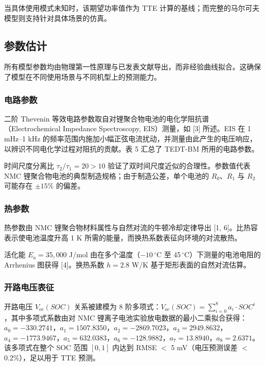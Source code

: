 \documentclass[11pt,a4paper]{ctexart}
\begin{document}
当具体使用模式未知时，该期望功率值作为 TTE 计算的基线；而完整的马尔可夫模型则支持针对具体场景的仿真。

\subsection{参数估计}

所有模型参数均由物理第一性原理与已发表文献导出，而非经验曲线拟合。这确保了模型在不同使用场景与不同机型上的预测能力。

\subsubsection{电路参数}

二阶 Thevenin 等效电路参数取自对锂聚合物电池的电化学阻抗谱（Electrochemical Impedance Spectroscopy, EIS）测量，如 [3] 所述。EIS 在 1 mHz--1 kHz 的频率范围内施加小幅正弦电流扰动，并测量由此产生的电压响应，以辨识不同电化学过程对阻抗的贡献。表 5 汇总了 TEDT-BM 所用的电路参数。

时间尺度分离比 $\tau_2/\tau_1 = 20 > 10$ 验证了双时间尺度近似的合理性。参数值代表 NMC 锂聚合物电池的典型制造规格；由于制造公差，单个电池的 $R_0$、$R_1$ 与 $R_2$ 可能存在 $\pm 15\%$ 的偏差。

\subsubsection{热参数}

热参数由 NMC 锂聚合物材料属性与自然对流的牛顿冷却定律导出 [1, 6]。比热容表示使电池温度升高 1 K 所需的能量，而换热系数表征向环境的对流散热。

活化能 $E_a = 35{,}000$ J/mol 由在多个温度（$-10\,^{\circ}$C 至 45\,$^{\circ}$C）下测量的电池电阻的 Arrhenius 图获得 [4]。换热系数 $h = 2.8$ W/K 基于矩形表面的自然对流估算。

\subsubsection{开路电压表征}

开路电压 $V_{oc}(SOC)$ 关系被建模为 8 阶多项式：$V_{oc}(SOC) = \sum_{i=0}^{8}a_i\cdot SOC^{i}$，其中多项式系数由对 NMC 锂离子电池实验放电数据的最小二乘拟合获得：$a_0 = -330.2741$，$a_1 = 1507.8350$，$a_2 = -2869.7023$，$a_3 = 2949.8632$，$a_4 = -1773.9467$，$a_5 = 632.0383$，$a_6 = -128.9882$，$a_7 = 13.8940$，$a_8 = 2.6371$。该多项式在整个 SOC 范围 $[0,1]$ 内达到 RMSE $<$ 5 mV（电压预测误差 $<$ 0.2\%），足以用于 TTE 预测。
\end{document}
